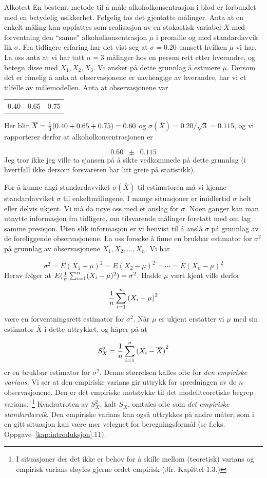\begin{eksempel}{Alkotest}
En bestemt metode til å måle alkoholkonsentrasjon i blod
er forbundet med en betydelig usikkerhet. Følgelig tas det
gjentatte målinger. Anta at en enkelt måling kan
oppfattes som realisasjon av en stokastisk variabel $X$ med
forventning den ``sanne" alkoholkonsentrasjon  $\mu$ i promille
og med standardavvik lik $\sigma$. Fra tidligere erfaring har det
vist seg at $\sigma=0.20$ uansett hvilken $\mu$ vi har. La oss
anta at vi har tatt $n=3$ målinger hos en person rett etter
hverandre, og betegn disse med $X_1,X_2,X_3$. Vi ønsker på
dette grunnlag å estimere $\mu$. Dersom det er rimelig å
anta at observasjonene er uavhengige av hverandre, har vi et
tilfelle av målemodellen. Anta at observasjonene var
\begin{center}
\begin{tabular}{ccc}
    0.40 &  0.65 & 0.75
\end{tabular}
\end{center}
Her blir $\bar X = {1\over 3}(0.40 + 0.65 + 0.75)=0.60$ og
$\sigma(\bar X)=0.20/{\sqrt 3}=0.115$, og vi rapporterer derfor at
alkoholkonsentrasjonen er

\[     0.60 \; \; \pm \; \; 0.115 \]
Jeg tror ikke jeg ville ta sjansen på å sikte vedkommede
på dette grunnlag (i hvertfall ikke dersom forsvareren har
litt greie på statistikk).
\end{eksempel}

For å kunne angi standardavviket $\sigma (\bar X)$ til
estimatoren må vi kjenne standardavviket $\sigma$ til
enkeltmålingene. I mange situasjoner er imidlertid $\sigma$
helt eller delvis ukjent. Vi må da nøye oss med et anslag
for $\sigma$. Noen ganger kan man utnytte informasjon fra
tidligere, om tilsvarende målinger foretatt med om lag samme
presisjon. Uten slik informasjon er vi henvist til å
anslå $\sigma$ på grunnlag av de foreliggende
observasjonene. La oss forsøke å finne en brukbar
estimator for $\sigma ^2$ på grunnlag av observasjonene 
$X_1,X_2,\ldots, X_n$. Vi har

\[\sigma ^2=E{(X_1-\mu )}^2=E{(X_2-\mu )}^2=\cdots =E{(X_n-\mu )}^2\]
Herav følger at $E({1\over n}\sum_{i=1}^n(X_i-\mu )^2)=\sigma ^2$.
Hadde $\mu$ vært kjent ville derfor

\[  {1\over n}\sum_{i=1}^n{(X_i-\mu )}^2 \]
være en forventningsrett estimator for $\sigma ^2$. Når
$\mu$ er ukjent erstatter vi $\mu$ med sin estimator $\bar X$
i dette uttrykket, og håper på at

\[ S_X^2={1\over n}\sum_{i=1}^n{(X_i-\bar X)}^2      \]
er en brukbar estimator for $\sigma ^2$. Denne
størrelsen kalles ofte for {\em den empiriske varians.} Vi ser
at den empiriske varians gir uttrykk for spredningen av de $n$
observasjonene. Den er det empiriske motstykke til det
modell\-teoretiske begrep varians.\
\footnote{I situasjoner der det ikke er behov for å skille mellom 
(teoretisk) varians og empirisk varians sløyfes gjerne ordet empirisk
 (Jfr. Kapittel 1.3.)}
 Kvadratroten av $S_X^2$, kalt $S_X$, omtales ofte
som {\em det empiriske standardavvik}. Den empiriske varians kan
også uttrykkes på andre måter, som i en gitt
situasjon kan være mer velegnet for bereg\-nings\-formål (se
f.eks. Oppgave~\ref*{kap:introduksjon}.11). 

